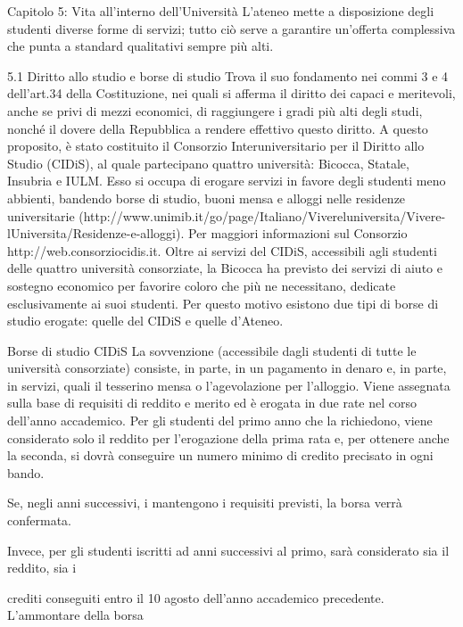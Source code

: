 Capitolo 5: Vita all'interno dell'Università
L'ateneo mette a disposizione degli studenti diverse forme di servizi; tutto ciò serve a garantire un'offerta complessiva che punta a standard qualitativi sempre più alti. 

5.1 Diritto allo studio e borse di studio
Trova il suo fondamento nei commi 3 e 4 dell'art.34 della Costituzione, nei quali si afferma il diritto dei capaci e meritevoli, anche se privi di mezzi economici, di raggiungere i gradi più alti degli studi, nonché il dovere della Repubblica a rendere effettivo questo diritto. 
A questo proposito, è stato costituito il Consorzio Interuniversitario per il Diritto allo Studio (CIDiS), al quale partecipano quattro università: Bicocca, Statale, Insubria e IULM.  Esso si occupa di erogare servizi in favore degli studenti meno abbienti, bandendo borse di studio, buoni mensa e alloggi nelle residenze universitarie (http://www.unimib.it/go/page/Italiano/Vivereluniversita/Vivere-lUniversita/Residenze-e-alloggi). Per maggiori informazioni sul Consorzio http://web.consorziocidis.it. 
Oltre ai servizi del CIDiS, accessibili agli studenti delle quattro università consorziate, la Bicocca ha previsto dei servizi di aiuto e sostegno economico per favorire coloro che più ne necessitano, dedicate esclusivamente ai suoi studenti. Per questo motivo esistono due tipi di borse di studio erogate: quelle del CIDiS e quelle d'Ateneo. 

Borse di studio CIDiS
La sovvenzione (accessibile dagli studenti di tutte le università consorziate) consiste, in parte, in un pagamento in denaro e, in parte, in servizi, quali il tesserino mensa o l'agevolazione per l'alloggio. Viene assegnata sulla base di requisiti di reddito e merito ed è erogata in due rate nel corso dell'anno accademico. Per gli studenti del primo anno che la richiedono, viene considerato solo il reddito per l'erogazione della prima rata e, per ottenere anche la seconda, si dovrà conseguire un numero minimo di credito precisato in  ogni bando. 



Se, negli anni successivi, i mantengono i requisiti previsti, la borsa verrà confermata. 



Invece, per gli studenti iscritti ad anni successivi al primo, sarà considerato sia il reddito, sia i 



crediti conseguiti entro il 10 agosto dell'anno accademico precedente. L'ammontare della borsa 



